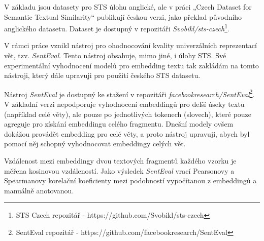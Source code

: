 \documentclass[thesis=M,czech]{FITthesis}[2019/12/23]
\begin{document}
V základu jsou datasety pro STS úlohu anglické, ale v práci „Czech Dataset for Semantic Textual Similarity“\cite{svoboda2018} publikují českou verzi, jako překlad původního anglického datasetu. Dataset je dostupný v repozitáři \textit{Svobikl/sts-czech}\footnote{STS Czech repozitář - https://github.com/Svobikl/sts-czech}.

V rámci práce\cite{conneau2018} vznikl nástroj pro ohodnocování kvality univerzálních reprezentací vět, tzv. \textit{SentEval}. Tento nástroj obsahuje, mimo jiné, i úlohy STS. Své experimentální vyhodnocení modelů pro embedding textu tak zakládám na tomto nástroji, který dále upravuji pro použití českého STS datasetu.

Nástroj \textit{SentEval} je dostupný ke stažení v repozitáři  \textit{facebookresearch/SentEval}\footnote{SentEval repozitář - https://github.com/facebookresearch/SentEval}. V základní verzi nepodporuje vyhodnocení embeddingů pro delší úseky textu (například celé věty), ale pouze po jednotlivých tokenech (slovech), které pouze agreguje pro získání embeddingu celého fragmentu. Dnešní modely ovšem dokážou provádět embedding pro celé věty, a proto nástroj upravuji, abych byl pomocí něj schopný vyhodnocovat embeddingy celých vět.

Vzdálenost mezi embeddingy dvou textových fragmentů každého vzorku je měřena kosinovou vzdáleností. Jako výsledek \textit{SentEval} vrací Pearsonovy a Spearmanovy korelační koeficienty mezi podobností vypočítanou z embeddingů a manuálně anotovanou.
\end{document}
